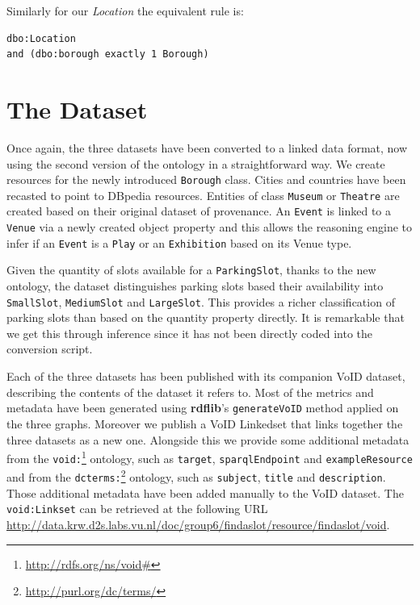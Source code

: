 \documentclass[runningheads,a4paper]{../../StyleFiles/llncs}
\begin{document}
Similarly for our \textit{Location} the equivalent rule is: 

\begin{lstlisting}[captionpos=b, title=Class equivalent to Location with the use of our subproperty borough, label=lst:owl, basicstyle=\ttfamily\small,frame=bt]
dbo:Location 
and (dbo:borough exactly 1 Borough)
\end{lstlisting}

\section{The Dataset}
Once again, the three datasets have been converted to a linked data format, now using the second version of the ontology in a straightforward way. We create resources for the newly introduced \texttt{Borough} class. Cities and countries have been recasted to point to DBpedia resources. Entities of class \texttt{Museum} or \texttt{Theatre} are created based on their original dataset of provenance. An \texttt{Event} is linked to a \texttt{Venue} via a newly created object property and this allows the reasoning engine to infer if an \texttt{Event} is a \texttt{Play} or an \texttt{Exhibition} based on its Venue type.

Given the quantity of slots available for a \texttt{ParkingSlot}, thanks to the new ontology, the dataset distinguishes parking slots based their availability into \texttt{SmallSlot}, \texttt{MediumSlot} and \texttt{LargeSlot}. This provides a richer classification of parking slots than based on the quantity
property directly. It is remarkable that we get this through inference since it has not been directly coded into the conversion script.

Each of the three datasets has been published with its companion VoID dataset, describing the contents of the dataset it refers to. Most of the metrics and metadata have been generated using \textbf{rdflib}'s \texttt{generateVoID}
method applied on the three graphs.
Moreover we publish a VoID Linkedset that links together the three datasets as a
new one. Alongside this we provide some additional metadata from the
\texttt{void:}\footnote{\url{http://rdfs.org/ns/void#}} ontology, such as
\texttt{target}, \texttt{sparqlEndpoint} and
\texttt{exampleResource} and from the
\texttt{dcterms:}\footnote{\url{http://purl.org/dc/terms/}} ontology, such as
\texttt{subject}, \texttt{title} and
\texttt{description}. Those additional metadata have been added manually
to the VoID dataset. The \texttt{void:Linkset} can be retrieved at the following
URL \url{http://data.krw.d2s.labs.vu.nl/doc/group6/findaslot/resource/findaslot/void}.
\end{document}
